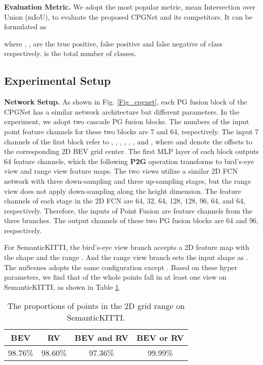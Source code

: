 \documentclass[letterpaper, 10 pt, conference]{ieeeconf}
\begin{document}
{\bf Evaluation Metric.} We adopt the most popular metric, mean Intersection over Union (mIoU), to evaluate the proposed CPGNet and its competitors. It can be formulated as

where , ,  are the true positive, false positive and false negative of  class respectively.  is the total number of classes.


\subsection{Experimental Setup}
{\bf Network Setup.}
As shown in Fig. \ref{Fig_cpgnet}, each PG fusion block of the CPGNet has a similar network architecture but different parameters. In the experiment, we adopt two cascade PG fusion blocks. The numbers of the input point feature channels for these two blocks are 7 and 64, respectively. The input 7 channels of the first block refer to , , , , , , and , where  and  denote the offsets to the corresponding 2D BEV grid center. The first MLP layer of each block outputs 64 feature channels, which the following {\bf P2G} operation transforms to bird’s-eye view and range view feature maps. The two views utilize a similar 2D FCN network with three down-sampling and three up-sampling stages, but the range view does not apply down-sampling along the height dimension. The feature channels of each stage in the 2D FCN are 64, 32, 64, 128, 128, 96, 64, and 64, respectively. Therefore, the inputs of Point Fusion are  feature channels from the three branches. The output channels of these two PG fusion blocks are 64 and 96, respectively.

For SemanticKITTI, the bird’s-eye view branch accepts a 2D feature map with the shape  and the range . And the range view branch sets the input shape as . The nuScenes adopts the same configuration except . Based on these hyper parameters, we find that  of the whole points fall in at least one view on SemanticKITTI, as shown in Table \ref{table_in_range}.

\begin{table}[t]
\caption{The proportions of points in the 2D grid range on SemanticKITTI.}
\label{table_in_range}
\begin{center}
\begin{tabular}{c|c|c|c}
\hline
BEV & RV & BEV and RV & BEV or RV\\
\hline
98.76\% & 98.60\% & 97.36\% & 99.99\%\\
\hline
\end{tabular}
\end{center}
\end{table}
\end{document}
